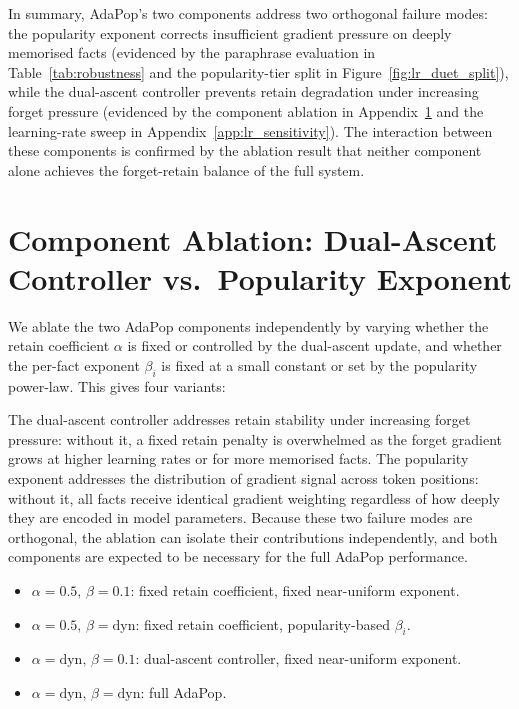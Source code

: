 In summary, AdaPop's two components address two orthogonal failure modes: the popularity exponent corrects insufficient gradient pressure on deeply memorised facts (evidenced by the paraphrase evaluation in Table~\ref{tab:robustness} and the popularity-tier split in Figure~\ref{fig:lr_duet_split}), while the dual-ascent controller prevents retain degradation under increasing forget pressure (evidenced by the component ablation in Appendix~\ref{app:ablation} and the learning-rate sweep in Appendix~\ref{app:lr_sensitivity}). The interaction between these components is confirmed by the ablation result that neither component alone achieves the forget-retain balance of the full system.

\section{Component Ablation: Dual-Ascent Controller vs.\ Popularity Exponent}
\label{app:ablation}

We ablate the two AdaPop components independently by varying whether the retain coefficient $\alpha$ is fixed or controlled by the dual-ascent update, and whether the per-fact exponent $\beta_i$ is fixed at a small constant or set by the popularity power-law. This gives four variants:

The dual-ascent controller addresses retain stability under increasing forget pressure: without it, a fixed retain penalty is overwhelmed as the forget gradient grows at higher learning rates or for more memorised facts. The popularity exponent addresses the distribution of gradient signal across token positions: without it, all facts receive identical gradient weighting regardless of how deeply they are encoded in model parameters. Because these two failure modes are orthogonal, the ablation can isolate their contributions independently, and both components are expected to be necessary for the full AdaPop performance.

\begin{itemize}
    \item $\alpha{=}0.5,\,\beta{=}0.1$: fixed retain coefficient, fixed near-uniform exponent.
    \item $\alpha{=}0.5,\,\beta{=}\text{dyn}$: fixed retain coefficient, popularity-based $\beta_i$.
    \item $\alpha{=}\text{dyn},\,\beta{=}0.1$: dual-ascent controller, fixed near-uniform exponent.
    \item $\alpha{=}\text{dyn},\,\beta{=}\text{dyn}$: full AdaPop.
\end{itemize}

